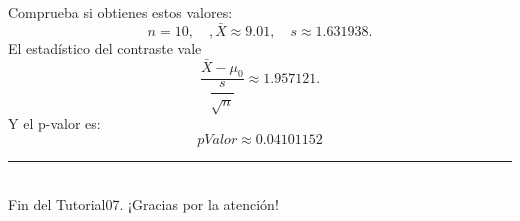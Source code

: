 \documentclass[10pt,a4paper]{article}\usepackage[]{graphicx}\usepackage[]{color}
\newcounter {cont01}
\begin{document}
Comprueba si obtienes estos valores:
\[n=10, \quad, \bar X\approx 9.01,\quad s\approx 1.631938.\]
El estadístico del contraste vale
\[\dfrac{\bar X-\mu_0}{\dfrac{s}{\sqrt{n}}}\approx 1.957121.\]
Y el p-valor es:
\[pValor\approx 0.04101152\]



%
%





\vspace{2cm} \hrule
\quad\\
Fin del Tutorial07. ¡Gracias por la atención!

%
\end{document}

